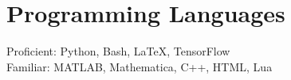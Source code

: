 \section{\sc Programming Languages}
Proficient: Python, Bash, \LaTeX, TensorFlow \\
Familiar: MATLAB, Mathematica, C++, HTML, Lua

\endinput